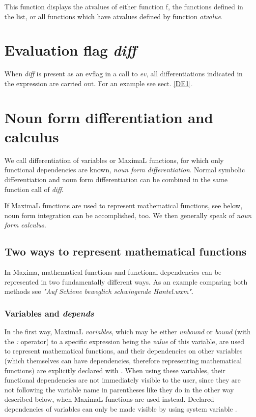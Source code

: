 \documentclass[../Maxima_Workbook.tex]{subfiles}
\begin{document}
\lz This function displays the atvalues of either function f, the functions defined in the list, or all functions which have atvalues defined by function \emph{atvalue}. 

\section{Evaluation flag \emph{diff}}

\lz {} \hfill {}

\lz When \emph{diff} is present as an evflag in a call to \emph{ev}, all differentiations indicated in the expression are carried out. For an example see sect. \ref{DE1}.

\section{Noun form differentiation and calculus}

We call differentiation of variables or MaximaL functions, for which only functional dependencies are known, \emph{noun form differentiation}. Normal symbolic differentiation and noun form differentiation can be combined in the same function call of \emph{diff}. 

\lz If MaximaL functions are used to represent mathematical functions, see below, noun form integration can be accomplished, too. We then generally speak of \emph{noun form calculus}.

\subsection{Two ways to represent mathematical functions}

In Maxima, mathematical functions and functional dependencies can be represented in two fundamentally different ways. As an example comparing both methods see \emph{"Auf Schiene beweglich schwingende Hantel.wxm"}.

\subsubsection{Variables and \emph{depends}}

In the first way, MaximaL \emph{variables}, which may be either \emph{unbound} or \emph{bound} (with the \emph{:} operator) to a specific expression being the \emph{value} of this variable, are used to represent  mathematical functions, and their dependencies on other variables (which themselves can have dependencies, therefore representing mathematical functions) are explicitly declared with . When using these variables, their functional dependencies are not immediately visible to the user, since they are not following the variable name in parentheses like they do in the other way described below, when MaximaL functions are used instead. Declared dependencies of variables can only be made visible by using system variable .
\end{document}
